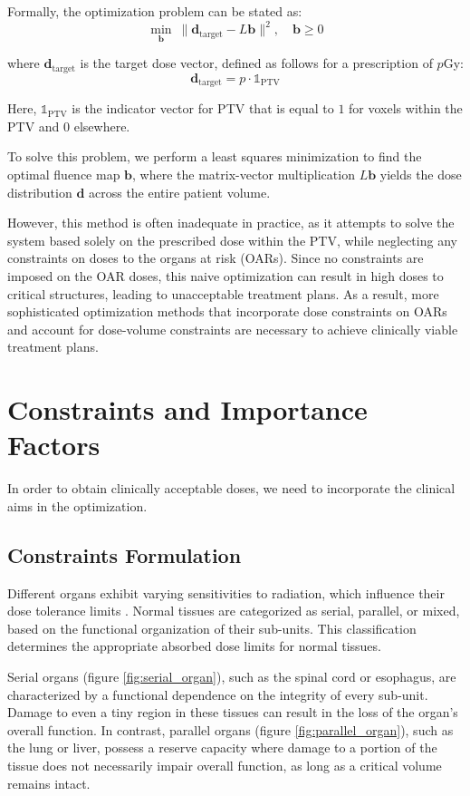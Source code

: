 Formally, the optimization problem can be stated as:
$$ \min_\mathbf{b} \ \| \mathbf{d}_{\text{target}} - L\mathbf{b} \|^2, \quad \mathbf{b} \geq 0$$

where $\mathbf{d}_{\text{target}}$ is the target dose vector, defined as follows for a prescription of $p$Gy:
$$ \mathbf{d}_{\text{target}} = p \cdot  \mathds{1}_{\text{PTV}} $$

Here, $\mathds{1}_{\text{PTV}}$ is the indicator vector for PTV that is equal to $1$ for voxels within the PTV and $0$ elsewhere.

To solve this problem, we perform a least squares minimization to find the optimal fluence map $\mathbf{b}$, where the matrix-vector multiplication $L\mathbf{b}$ yields the dose distribution $\mathbf{d}$ across the entire patient volume.

However, this method is often inadequate in practice, as it attempts to solve the system based solely on the prescribed dose within the PTV, while neglecting any constraints on doses to the organs at risk (OARs).
Since no constraints are imposed on the OAR doses, this naive optimization can result in high doses to critical structures, leading to unacceptable treatment plans.
As a result, more sophisticated optimization methods that incorporate dose constraints on OARs and account for dose-volume constraints are necessary to achieve clinically viable treatment plans.

\section{Constraints and Importance Factors}
In order to obtain clinically acceptable doses, we need to incorporate the clinical aims in the optimization.

\subsection{Constraints Formulation}
Different organs exhibit varying sensitivities to radiation, which influence their dose tolerance limits \cite{Withers1988} \cite{ICRU83}.
Normal tissues are categorized as serial, parallel, or mixed, based on the functional organization of their sub-units.
This classification determines the appropriate absorbed dose limits for normal tissues.

Serial organs (figure \ref{fig:serial_organ}), such as the spinal cord or esophagus, are characterized by a functional dependence on the integrity of every sub-unit.
Damage to even a tiny region in these tissues can result in the loss of the organ's overall function.
In contrast, parallel organs (figure \ref{fig:parallel_organ}), such as the lung or liver, possess a reserve capacity where damage to a portion of the tissue does not necessarily impair overall function, as long as a critical volume remains intact.

